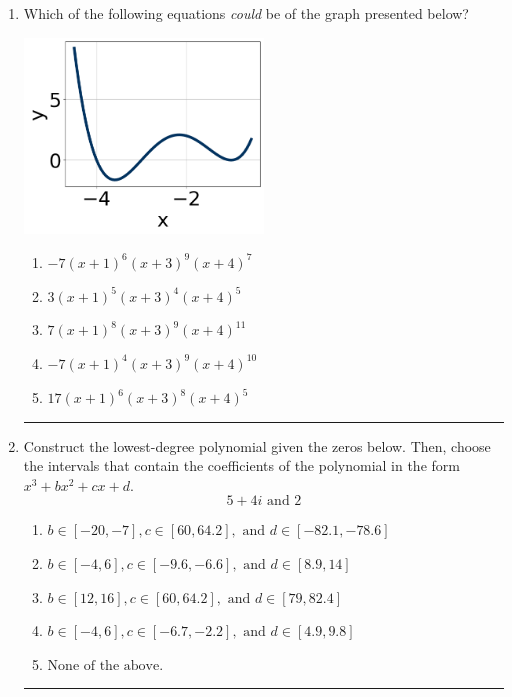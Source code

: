 \documentclass[14pt]{extbook}
\newcommand{\litem}[1]{\item#1\hspace*{-1cm}\rule{\textwidth}{0.4pt}}
\begin{document}
\begin{enumerate}
{\begin{enumerate}[label=\Alph*.]
\end{enumerate} }
\litem{
Which of the following equations \textit{could} be of the graph presented below?
\begin{center}
    \includegraphics[width=0.5\textwidth]{../Figures/polyGraphToFunctionA.png}
\end{center}
\begin{enumerate}[label=\Alph*.]
\item \( -7(x + 1)^{6} (x + 3)^{9} (x + 4)^{7} \)
\item \( 3(x + 1)^{5} (x + 3)^{4} (x + 4)^{5} \)
\item \( 7(x + 1)^{8} (x + 3)^{9} (x + 4)^{11} \)
\item \( -7(x + 1)^{4} (x + 3)^{9} (x + 4)^{10} \)
\item \( 17(x + 1)^{6} (x + 3)^{8} (x + 4)^{5} \)

\end{enumerate} }
\litem{
Construct the lowest-degree polynomial given the zeros below. Then, choose the intervals that contain the coefficients of the polynomial in the form $x^3+bx^2+cx+d$.\[ 5 + 4 i \text{ and } 2 \]\begin{enumerate}[label=\Alph*.]
\item \( b \in [-20, -7], c \in [60, 64.2], \text{ and } d \in [-82.1, -78.6] \)
\item \( b \in [-4, 6], c \in [-9.6, -6.6], \text{ and } d \in [8.9, 14] \)
\item \( b \in [12, 16], c \in [60, 64.2], \text{ and } d \in [79, 82.4] \)
\item \( b \in [-4, 6], c \in [-6.7, -2.2], \text{ and } d \in [4.9, 9.8] \)
\item \( \text{None of the above.} \)


\end{enumerate}}
\end{enumerate}
\end{document}
